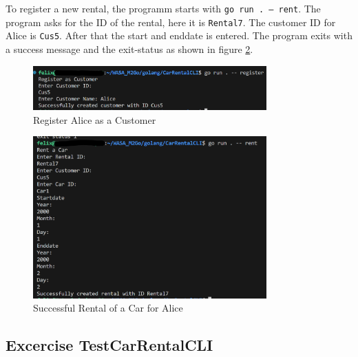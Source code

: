 To register a new rental, the programm starts with \texttt{go run . -- rent}.
The program asks for the ID of the rental, here it is \texttt{Rental7}.
The customer ID for Alice is \texttt{Cus5}.
After that the start and enddate is entered.
The program exits with a success message and the exit-status as shown in figure \ref{fig:car_rental_cli_rental_alice_successful}.

\begin{figure}
      \centering
      \includegraphics[width=0.8\textwidth]{figures/goLang/carRental/carRentalCLI/carRentalCLI_RegisterAlice.png}
      \caption{Register Alice as a Customer}
      \label{fig:car_rental_cli_register_alice}
\end{figure}
\begin{figure}
      \centering
      \includegraphics[width=0.8\textwidth]{figures/goLang/carRental/carRentalCLI/carRentalCLI_SuccessfulRentalAlice.png}
      \caption{Successful Rental of a Car for Alice}
      \label{fig:car_rental_cli_rental_alice_successful}
\end{figure}

\subsection{Excercise TestCarRentalCLI}
\label{sec:exercise_test_car_rental_cli}